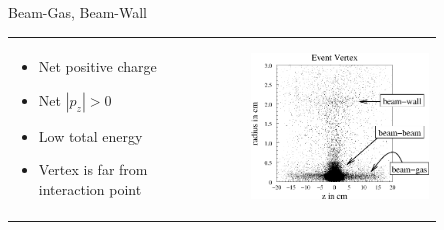 \begin{slide*}
\begin{minipage}[t]{\linewidth}
{\huge Beam-Gas, Beam-Wall}
\begin{center}
  \begin{tabular}{p{0.4\linewidth} c p{0.45\linewidth}}
    \begin{minipage}{\linewidth}
      \begin{itemize}
      \item Net positive charge
      \item Net $|p_z| > 0$
      \item Low total energy
      \item Vertex is far from interaction point
      \end{itemize}
    \end{minipage} & &
    \begin{minipage}{\linewidth}
      \begin{center}
	\includegraphics[width=\linewidth]{beamgaswall.eps}
      \end{center}
    \end{minipage}
  \end{tabular}
\end{center}

\end{minipage}
\end{slide*}



